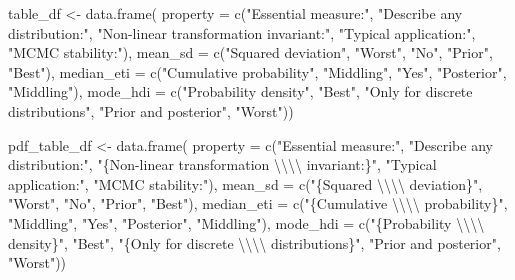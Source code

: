 \documentclass[
  12pt,
  letterpaper,
]{book}
\newenvironment{Shaded}{\begin{snugshade}}{\end{snugshade}}
\newcommand{\AttributeTok}[1]{\textcolor[rgb]{0.40,0.45,0.13}{#1}}
\newcommand{\FunctionTok}[1]{\textcolor[rgb]{0.28,0.35,0.67}{#1}}
\newcommand{\NormalTok}[1]{\textcolor[rgb]{0.00,0.23,0.31}{#1}}
\newcommand{\OtherTok}[1]{\textcolor[rgb]{0.00,0.23,0.31}{#1}}
\newcommand{\SpecialCharTok}[1]{\textcolor[rgb]{0.37,0.37,0.37}{#1}}
\newcommand{\StringTok}[1]{\textcolor[rgb]{0.13,0.47,0.30}{#1}}
\begin{document}
\begin{Shaded}
\begin{Highlighting}[]
\NormalTok{table\_df }\OtherTok{\textless{}{-}} \FunctionTok{data.frame}\NormalTok{(}
  \AttributeTok{property =} \FunctionTok{c}\NormalTok{(}\StringTok{"Essential measure:"}\NormalTok{, }\StringTok{"Describe any distribution:"}\NormalTok{, }\StringTok{"Non{-}linear transformation invariant:"}\NormalTok{, }\StringTok{"Typical application:"}\NormalTok{, }\StringTok{"MCMC stability:"}\NormalTok{),}
  \AttributeTok{mean\_sd =} \FunctionTok{c}\NormalTok{(}\StringTok{"Squared deviation"}\NormalTok{, }\StringTok{"Worst"}\NormalTok{, }\StringTok{"No"}\NormalTok{, }\StringTok{"Prior"}\NormalTok{, }\StringTok{"Best"}\NormalTok{),}
  \AttributeTok{median\_eti =} \FunctionTok{c}\NormalTok{(}\StringTok{"Cumulative probability"}\NormalTok{, }\StringTok{"Middling"}\NormalTok{, }\StringTok{"Yes"}\NormalTok{, }\StringTok{"Posterior"}\NormalTok{, }\StringTok{"Middling"}\NormalTok{),}
  \AttributeTok{mode\_hdi =} \FunctionTok{c}\NormalTok{(}\StringTok{"Probability density"}\NormalTok{, }\StringTok{"Best"}\NormalTok{, }\StringTok{"Only for discrete distributions"}\NormalTok{, }\StringTok{"Prior and posterior"}\NormalTok{, }\StringTok{"Worst"}\NormalTok{))}

\NormalTok{pdf\_table\_df }\OtherTok{\textless{}{-}} \FunctionTok{data.frame}\NormalTok{(}
  \AttributeTok{property =} \FunctionTok{c}\NormalTok{(}\StringTok{"Essential measure:"}\NormalTok{, }\StringTok{"Describe any distribution:"}\NormalTok{, }\StringTok{"\{Non{-}linear transformation }\SpecialCharTok{\textbackslash{}\textbackslash{}\textbackslash{}\textbackslash{}}\StringTok{ invariant:\}"}\NormalTok{, }\StringTok{"Typical application:"}\NormalTok{, }\StringTok{"MCMC stability:"}\NormalTok{),}
  \AttributeTok{mean\_sd =} \FunctionTok{c}\NormalTok{(}\StringTok{"\{Squared }\SpecialCharTok{\textbackslash{}\textbackslash{}\textbackslash{}\textbackslash{}}\StringTok{ deviation\}"}\NormalTok{, }\StringTok{"Worst"}\NormalTok{, }\StringTok{"No"}\NormalTok{, }\StringTok{"Prior"}\NormalTok{, }\StringTok{"Best"}\NormalTok{),}
  \AttributeTok{median\_eti =} \FunctionTok{c}\NormalTok{(}\StringTok{"\{Cumulative }\SpecialCharTok{\textbackslash{}\textbackslash{}\textbackslash{}\textbackslash{}}\StringTok{ probability\}"}\NormalTok{, }\StringTok{"Middling"}\NormalTok{, }\StringTok{"Yes"}\NormalTok{, }\StringTok{"Posterior"}\NormalTok{, }\StringTok{"Middling"}\NormalTok{),}
  \AttributeTok{mode\_hdi =} \FunctionTok{c}\NormalTok{(}\StringTok{"\{Probability }\SpecialCharTok{\textbackslash{}\textbackslash{}\textbackslash{}\textbackslash{}}\StringTok{ density\}"}\NormalTok{, }\StringTok{"Best"}\NormalTok{, }\StringTok{"\{Only for discrete }\SpecialCharTok{\textbackslash{}\textbackslash{}\textbackslash{}\textbackslash{}}\StringTok{ distributions\}"}\NormalTok{, }\StringTok{"Prior and posterior"}\NormalTok{, }\StringTok{"Worst"}\NormalTok{))}


\end{Highlighting}
\end{Shaded}
\end{document}
